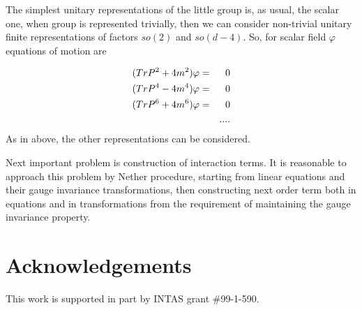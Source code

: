 \documentclass[a4paper,12pt]{article}
\begin{document}
The simplest unitary representations of the little group is, as usual, the
scalar one, when group is represented trivially, then we can consider
non-trivial unitary finite representations of factors $so(2)$ and $so(d-4).$
So, for scalar field $\varphi $ equations of motion are

\begin{eqnarray}
(TrP^{2}+4m^{2})\varphi  &=&0  \notag \\
(TrP^{4}-4m^{4})\varphi  &=&0 \\
(TrP^{6}+4m^{6})\varphi  &=&0  \notag \\
&&....  \notag
\end{eqnarray}
 As in above, the other representations can be considered.

 Next important problem is construction of interaction terms. It is
 reasonable to approach this
 problem by Nether procedure, starting
 from linear equations and their gauge invariance transformations,
 then constructing next order term both in equations and in
 transformations from
 the requirement
 of maintaining the gauge invariance property.


\section{Acknowledgements}

This work is supported in part by INTAS grant \#99-1-590.
\end{document}
